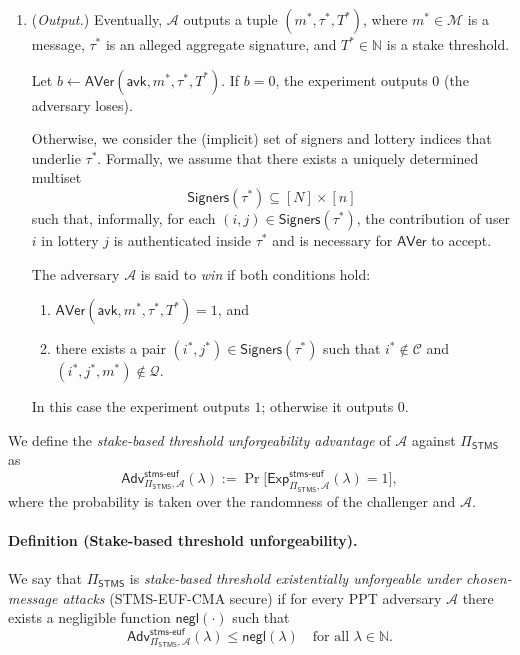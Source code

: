 \documentclass{article}
\begin{document}
\begin{enumerate}
        The above interaction may continue for an arbitrary (polynomially
        bounded) number of rounds.

  \item (\emph{Output.})
        Eventually, $\mathcal{A}$ outputs a tuple
        $(m^\ast, \tau^\ast, T^\ast)$, where $m^\ast \in \mathcal{M}$ is a
        message, $\tau^\ast$ is an alleged aggregate signature, and
        $T^\ast \in \mathbb{N}$ is a stake threshold.

        Let $b \leftarrow \mathsf{AVer}(\mathsf{avk}, m^\ast, \tau^\ast, T^\ast)$.
        If $b = 0$, the experiment outputs $0$ (the adversary loses).

        Otherwise, we consider the (implicit) set of signers and lottery
        indices that underlie $\tau^\ast$.  Formally, we assume that there
        exists a uniquely determined multiset
        \[
          \mathsf{Signers}( \tau^\ast )
          \subseteq [N] \times [n]
        \]
        such that, informally, for each $(i,j) \in \mathsf{Signers}(\tau^\ast)$,
        the contribution of user $i$ in lottery $j$ is authenticated inside
        $\tau^\ast$ and is necessary for $\mathsf{AVer}$ to accept.

        The adversary $\mathcal{A}$ is said to \emph{win} if both conditions
        hold:
        \begin{enumerate}
          \item $\mathsf{AVer}(\mathsf{avk}, m^\ast, \tau^\ast, T^\ast) = 1$, and
          \item there exists a pair $(i^\ast,j^\ast) \in \mathsf{Signers}(\tau^\ast)$
                such that $i^\ast \notin \mathcal{C}$ and
                $(i^\ast,j^\ast,m^\ast) \notin \mathcal{Q}$.
        \end{enumerate}

        In this case the experiment outputs $1$; otherwise it outputs $0$.
\end{enumerate}

We define the \emph{stake-based threshold unforgeability advantage} of
$\mathcal{A}$ against $\Pi_{\mathsf{STMS}}$ as
\[
  \mathsf{Adv}^{\mathsf{stms\mbox{-}euf}}_{\Pi_{\mathsf{STMS}},\mathcal{A}}(\lambda)
  :=
  \Pr\big[
    \mathsf{Exp}^{\mathsf{stms\mbox{-}euf}}_{\Pi_{\mathsf{STMS}},\mathcal{A}}(\lambda)
    = 1
  \big],
\]
where the probability is taken over the randomness of the challenger and
$\mathcal{A}$.

\paragraph{Definition (Stake-based threshold unforgeability).}
We say that $\Pi_{\mathsf{STMS}}$ is \emph{stake-based threshold
existentially unforgeable under chosen-message attacks} (STMS-EUF-CMA secure)
if for every PPT adversary $\mathcal{A}$ there exists a negligible function
$\mathsf{negl}(\cdot)$ such that
\[
  \mathsf{Adv}^{\mathsf{stms\mbox{-}euf}}_{\Pi_{\mathsf{STMS}},\mathcal{A}}(\lambda)
  \le \mathsf{negl}(\lambda)
  \quad\text{for all } \lambda \in \mathbb{N}.
\]
\end{document}
